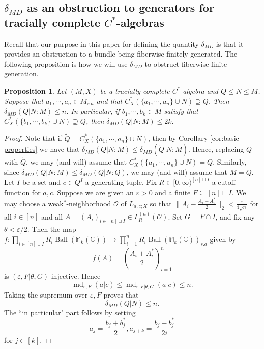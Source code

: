\documentclass[10pt]{amsart}
\newtheorem{prop}[thm]{Proposition}
\theoremstyle{definition}
\numberwithin{equation}{section}
\newcommand{\bC}{{\mathbb C}}
\newcommand{\bM}{{\mathbb M}}
\DeclareMathOperator{\Ball}{Ball}
\DeclareMathOperator{\md}{md}
\begin{document}
\subsection{$\delta_{MD}$ as an obstruction to generators for tracially complete $C^{*}$-algebras}

Recall that our purpose in this paper for defining the quantity $\delta_{MD}$ is that it provides an obstruction to a bundle being fiberwise finitely generated. The following proposition is how we will use $\delta_{MD}$ to obstruct fiberwise finite generation. 

\begin{prop}\label{prop: md bounds finite generation}
Let $(M,X)$ be a tracially complete $C^{*}$-algebra and $Q\leq N\leq M$. Suppose that $a_{1},\cdots,a_{n}\in M_{s.a}$ and that $C^{*}_{X}(\{a_{1},\cdots,a_{n}\}\cup N)\supseteq Q$. Then $\delta_{MD}(Q|N:M)\leq n$.   
In particular, if $b_{1},\cdots,b_{k}\in M$ satisfy that $C^{*}_{X}(\{b_{1},\cdots,b_{k}\}\cup N)\supseteq Q$, then $\delta_{MD}(Q|N:M)\leq 2k.$ 
\end{prop}

\begin{proof}
Note that if $\widetilde{Q}=C^{*}_{X}(\{a_{1},\cdots,a_{n}\}\cup N)$, then by Corollary \ref{cor:basic properties} we have that $\delta_{MD}(Q|N:M)\leq \delta_{MD}(\widetilde{Q}|N:M)$. Hence, replacing $Q$ with $\widetilde{Q}$, we may (and will) assume that $C^{*}_{X}(\{a_{1},\cdots,a_{n}\}\cup N)=Q$. Similarly, since $\delta_{MD}(Q|N:M)\leq \delta_{MD}(Q|N:Q)$, we may (and will) assume that $M=Q$. Let $I$ be a set and $c\in Q^{I}$ a generating tuple. Fix $R\in [0,\infty)^{[n]\sqcup I}$ a cutoff function for $a,c$. Suppose we are given an $\varepsilon>0$ and a finite $F\subseteq [n]\sqcup I$.
We may choose a weak$^{*}$-neighborhood $\mathcal{O}$ of $L_{a,c;X}$ so that $\|A_{i}-\frac{A_{i}+A_{i}^{*}}{2}\|_{2}<\frac{\varepsilon}{4\sqrt{n}}$ for all $i\in [n]$ and all $A=(A_{i})_{i\in [n]\sqcup I}\in \Gamma^{(n)}_{R}(\mathcal{O})$. 
Set $G=F\cap I$, and fix any $\theta<\varepsilon/2$. Then the  map $f\colon \prod_{i\in [n]\sqcup I}R_{i}\Ball(\bM_{k}(\bC))\to \prod_{i=1}^{n}R_{i}\Ball(\bM_{k}(\bC))_{s.a}$ given by
\[f(A)=\left(\frac{A_{i}+A_{i}^{*}}{2}\right)_{i=1}^{n}\] is $(\varepsilon,F|\theta,G)$-injective.
Hence
\[\md_{\varepsilon,F}(a|c)\leq \md_{\varepsilon,F|\theta,G}(a|c)\leq n.\]
Taking  the supremum over $\varepsilon,F$ proves that 
\[\delta_{MD}(Q|N)\leq n.\]
The ``in particular" part follows by setting 
\[a_{j}=\frac{b_{j}+b_{j}^{*}}{2},a_{j+k}=\frac{b_{j}-b_{j}^{*}}{2i}\]
for $j\in [k]$. 

\end{proof}
\end{document}
